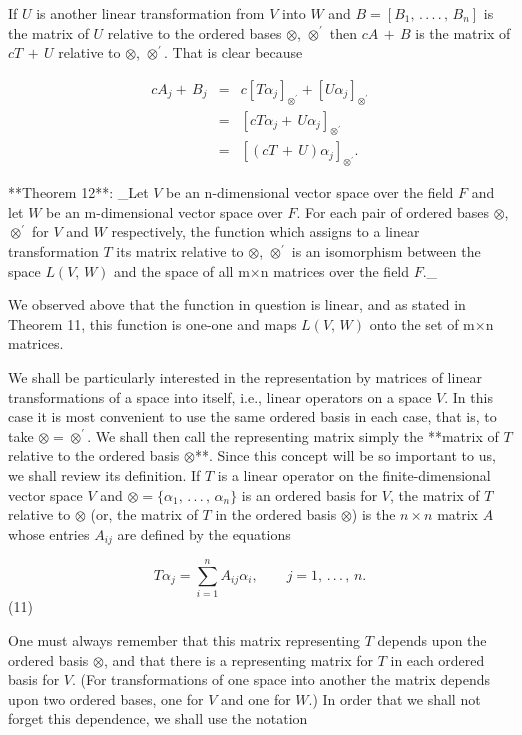 If \(U\) is another linear transformation from \(V\) into \(W\) and \(B=[B_{1},\,.\,.\,.\,.\,,\,B_{n}]\) is the matrix of \(U\) relative to the ordered bases \(\otimes\), \(\otimes^{\prime}\) then \(cA\,+\,B\) is the matrix of \(cT\,+\,U\) relative to \(\otimes\), \(\otimes^{\prime}\). That is clear because

\[\begin{array}{rcl}cA_{j}+\,B_{j}&=&c[T\alpha_{j}]_{\otimes^{\prime}}+[U\alpha _{j}]_{\otimes^{\prime}}\\ &=&[cT\alpha_{j}+\,U\alpha_{j}]_{\otimes^{\prime}}\\ &=&[(cT\,+\,U)\alpha_{j}]_{\otimes^{\prime}}.\end{array}\]

**Theorem 12**: _Let \(V\) be an n-dimensional vector space over the field \(F\) and let \(W\) be an m-dimensional vector space over \(F\). For each pair of ordered bases \(\otimes\), \(\otimes^{\prime}\) for \(V\) and \(W\) respectively, the function which assigns to a linear transformation \(T\) its matrix relative to \(\otimes\), \(\otimes^{\prime}\) is an isomorphism between the space \(L(V,\,W)\) and the space of all m\(\times\)n matrices over the field \(F\)._

We observed above that the function in question is linear, and as stated in Theorem 11, this function is one-one and maps \(L(V,\,W)\) onto the set of m\(\times\)n matrices.

We shall be particularly interested in the representation by matrices of linear transformations of a space into itself, i.e., linear operators on a space \(V\). In this case it is most convenient to use the same ordered basis in each case, that is, to take \(\otimes=\otimes^{\prime}\). We shall then call the representing matrix simply the **matrix of \(T\) relative to the ordered basis \(\otimes\)**. Since this concept will be so important to us, we shall review its definition. If \(T\) is a linear operator on the finite-dimensional vector space \(V\) and \(\otimes=\{\alpha_{1},\,.\,.\,.\,,\,\alpha_{n}\}\) is an ordered basis for \(V\), the matrix of \(T\) relative to \(\otimes\) (or, the matrix of \(T\) in the ordered basis \(\otimes\)) is the \(n\times n\) matrix \(A\) whose entries \(A_{ij}\) are defined by the equations

\[T\alpha_{j}=\sum_{i=1}^{n}A_{ij}\alpha_{i},\qquad j=1,\,.\,.\,.\,,\,n.\] (11)

One must always remember that this matrix representing \(T\) depends upon the ordered basis \(\otimes\), and that there is a representing matrix for \(T\) in each ordered basis for \(V\). (For transformations of one space into another the matrix depends upon two ordered bases, one for \(V\) and one for \(W\).) In order that we shall not forget this dependence, we shall use the notation

